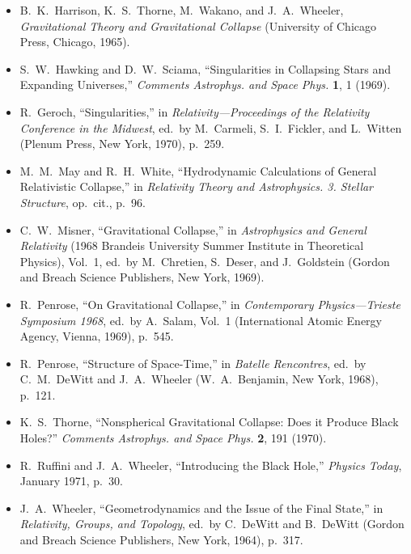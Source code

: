\begin{itemize}
  \item[\(\square\)] B.~K.~Harrison, K.~S.~Thorne, M.~Wakano, and
  J.~A.~Wheeler, \emph{Gravitational Theory and Gravitational Collapse}
  (University of Chicago Press, Chicago, 1965).

  \item[\(\square\)] S.~W.~Hawking and D.~W.~Sciama, ``Singularities in
  Collapsing Stars and Expanding Universes,'' \emph{Comments Astrophys.
  and Space Phys.} \textbf{1}, 1 (1969).

  \item[\(\square\)] R.~Geroch, ``Singularities,'' in
  \emph{Relativity---Proceedings of the Relativity Conference in the
  Midwest}, ed.\ by M.~Carmeli, S.~I.~Fickler, and L.~Witten (Plenum
  Press, New York, 1970), p.~259.

  \item[\(\square\)] M.~M.~May and R.~H.~White, ``Hydrodynamic
  Calculations of General Relativistic Collapse,'' in \emph{Relativity
  Theory and Astrophysics. 3. Stellar Structure}, op.\ cit., p.~96.

  \item[\(\square\)] C.~W.~Misner, ``Gravitational Collapse,'' in
  \emph{Astrophysics and General Relativity} (1968 Brandeis University
  Summer Institute in Theoretical Physics), Vol.~1, ed.\ by M.~Chretien,
  S.~Deser, and J.~Goldstein (Gordon and Breach Science Publishers, New
  York, 1969).

  \item[\(\square\)] R.~Penrose, ``On Gravitational Collapse,'' in
  \emph{Contemporary Physics---Trieste Symposium 1968}, ed.\ by A.~Salam,
  Vol.~1 (International Atomic Energy Agency, Vienna, 1969), p.~545.

  \item[\(\square\)] R.~Penrose, ``Structure of Space-Time,'' in
  \emph{Batelle Rencontres}, ed.\ by C.~M.~DeWitt and J.~A.~Wheeler
  (W.~A.~Benjamin, New York, 1968), p.~121.

  \item[\(\square\)] K.~S.~Thorne, ``Nonspherical Gravitational Collapse:
  Does it Produce Black Holes?'' \emph{Comments Astrophys. and Space
  Phys.} \textbf{2}, 191 (1970).

  \item[\(\square\)] R.~Ruffini and J.~A.~Wheeler, ``Introducing the Black
  Hole,'' \emph{Physics Today}, January 1971, p.~30.

  \item[\(\square\)] J.~A.~Wheeler, ``Geometrodynamics and the Issue of
  the Final State,'' in \emph{Relativity, Groups, and Topology}, ed.\ by
  C.~DeWitt and B.~DeWitt (Gordon and Breach Science Publishers, New
  York, 1964), p.~317.
\end{itemize}

